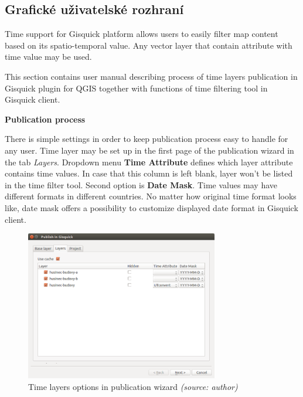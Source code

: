 \newpage
\subsection{Grafické uživatelské rozhraní}
\label{sssec:manual-gui}

Time support for Gisquick platform allows users to easily filter 
map content based on its spatio-temporal value. Any vector layer that 
contain attribute with time value may be used. 

This section contains user manual describing process of time layers 
publication in Gisquick plugin for QGIS together with functions of time
filtering tool in Gisquick client.  

\bigskip
\noindent \textbf{Publication process}

There is simple settings in order to keep publication process easy to 
handle for any user. Time layer may be set up in the first
page of the publication wizard in the tab \textit{Layers}.  Dropdown
menu \textbf{Time Attribute} defines which layer attribute contains
time values. In case that this column is left blank, layer won't be listed
in the time filter tool. Second option is \textbf{Date Mask}. Time
values may have different formats in different countries. No matter
how original time format looks like, date mask offers a possibility to
customize displayed date format in Gisquick client.

\begin{figure}[h!]
	\centering
	\includegraphics[width=0.75\textwidth]{./img/plugin-layers.png}
	\caption{Time layers options in publication wizard \textit{(source: author)}}
	\label{fig:publication-wizard-layers}
\end{figure}


